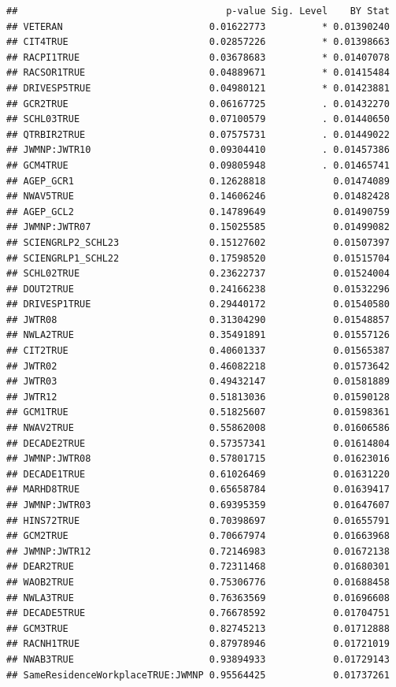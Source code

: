 \documentclass[
]{article}
\begin{document}
\begin{verbatim}
##                                     p-value Sig. Level    BY Stat
## VETERAN                          0.01622773          * 0.01390240
## CIT4TRUE                         0.02857226          * 0.01398663
## RACPI1TRUE                       0.03678683          * 0.01407078
## RACSOR1TRUE                      0.04889671          * 0.01415484
## DRIVESP5TRUE                     0.04980121          * 0.01423881
## GCR2TRUE                         0.06167725          . 0.01432270
## SCHL03TRUE                       0.07100579          . 0.01440650
## QTRBIR2TRUE                      0.07575731          . 0.01449022
## JWMNP:JWTR10                     0.09304410          . 0.01457386
## GCM4TRUE                         0.09805948          . 0.01465741
## AGEP_GCR1                        0.12628818            0.01474089
## NWAV5TRUE                        0.14606246            0.01482428
## AGEP_GCL2                        0.14789649            0.01490759
## JWMNP:JWTR07                     0.15025585            0.01499082
## SCIENGRLP2_SCHL23                0.15127602            0.01507397
## SCIENGRLP1_SCHL22                0.17598520            0.01515704
## SCHL02TRUE                       0.23622737            0.01524004
## DOUT2TRUE                        0.24166238            0.01532296
## DRIVESP1TRUE                     0.29440172            0.01540580
## JWTR08                           0.31304290            0.01548857
## NWLA2TRUE                        0.35491891            0.01557126
## CIT2TRUE                         0.40601337            0.01565387
## JWTR02                           0.46082218            0.01573642
## JWTR03                           0.49432147            0.01581889
## JWTR12                           0.51813036            0.01590128
## GCM1TRUE                         0.51825607            0.01598361
## NWAV2TRUE                        0.55862008            0.01606586
## DECADE2TRUE                      0.57357341            0.01614804
## JWMNP:JWTR08                     0.57801715            0.01623016
## DECADE1TRUE                      0.61026469            0.01631220
## MARHD8TRUE                       0.65658784            0.01639417
## JWMNP:JWTR03                     0.69395359            0.01647607
## HINS72TRUE                       0.70398697            0.01655791
## GCM2TRUE                         0.70667974            0.01663968
## JWMNP:JWTR12                     0.72146983            0.01672138
## DEAR2TRUE                        0.72311468            0.01680301
## WAOB2TRUE                        0.75306776            0.01688458
## NWLA3TRUE                        0.76363569            0.01696608
## DECADE5TRUE                      0.76678592            0.01704751
## GCM3TRUE                         0.82745213            0.01712888
## RACNH1TRUE                       0.87978946            0.01721019
## NWAB3TRUE                        0.93894933            0.01729143
## SameResidenceWorkplaceTRUE:JWMNP 0.95564425            0.01737261
\end{verbatim}
\end{document}
